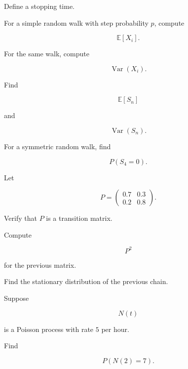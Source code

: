 \begin{exercise}[1]
Define a stopping time.
\end{exercise}

\begin{exercise}[2]
For a simple random walk with step probability \(p\), compute

\[
\mathbb{E}[X_i].
\]
\end{exercise}

\begin{exercise}[2]
For the same walk, compute

\[
\operatorname{Var}(X_i).
\]
\end{exercise}

\begin{exercise}[2]
Find

\[
\mathbb{E}[S_n]
\]

and

\[
\operatorname{Var}(S_n).
\]
\end{exercise}

\begin{exercise}[2]
For a symmetric random walk, find

\[
P(S_4=0).
\]
\end{exercise}

\begin{exercise}[2]
Let

\[
P
=
\begin{pmatrix}
0.7&0.3\\
0.2&0.8
\end{pmatrix}.
\]

Verify that \(P\) is a transition matrix.
\end{exercise}

\begin{exercise}[2]
Compute

\[
P^2
\]

for the previous matrix.
\end{exercise}

\begin{exercise}[2]
Find the stationary distribution of the previous chain.
\end{exercise}

\begin{exercise}[2]
Suppose

\[
N(t)
\]

is a Poisson process with rate \(5\) per hour.

Find

\[
P(N(2)=7).
\]
\end{exercise}


